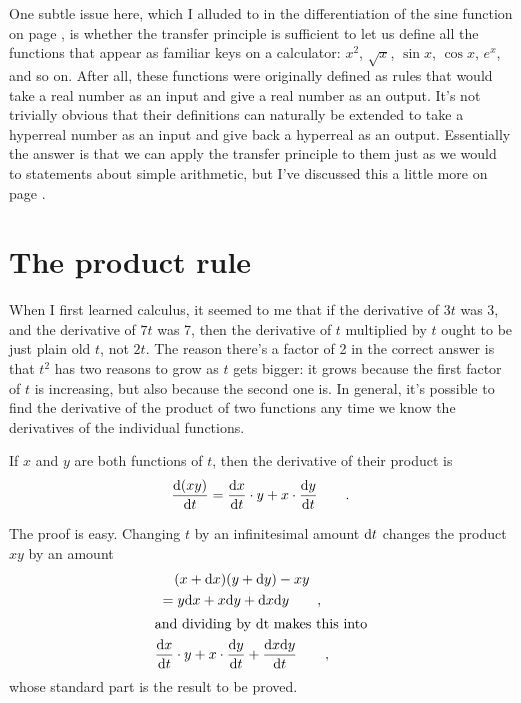 \label{transcendentals}
One subtle issue here, which I alluded to in the differentiation of the sine function on page \pageref{eg:derivative-of-sin},
is whether the transfer principle is sufficient to let us define all the functions that
appear as familiar keys on a calculator: $x^2$, $\sqrt{x}$, $\sin x$, $\cos x$, $e^x$, and so on.
After all, these functions were originally defined as rules that would take a real number as an input
and give a real number as an output. It's not trivially obvious that their definitions can naturally be extended
to take a hyperreal number as an input and give back a hyperreal as an output. Essentially the answer is that
we can apply the transfer principle to them just as we would to statements about simple arithmetic, but I've discussed
this a little more on page \pageref{detour:transcendentals}.

\section{The product rule}

When I first learned calculus, it seemed to me that if the derivative of $3t$ was $3$, and the derivative of
$7t$ was 7, then the derivative of $t$ multiplied by $t$ ought to be just plain old $t$, not $2t$. The reason there's
a factor of 2 in the correct answer is that $t^2$ has two reasons to grow as $t$ gets bigger: it grows because
the first factor of $t$ is increasing, but also because the second one is. In general, it's possible to find
the derivative of the product of two functions any time we know the derivatives of the individual functions.

\begin{important}
If $x$ and $y$ are both functions of $t$, then the derivative of their product is
\begin{equation*}
  \frac{\textup{d}(xy)}{\textup{d} t} = \frac{\textup{d} x}{\textup{d} t}\cdot y +  x \cdot \frac{\textup{d} y}{\textup{d} t} \qquad .
\end{equation*}
\end{important}

The proof is easy. Changing $t$ by an infinitesimal amount $\textup{d} t$ changes the product $xy$ by
an amount
\begin{gather*}
  (x+\textup{d} x)(y+\textup{d} y)-xy \\
      = y\textup{d} x + x\textup{d} y+\textup{d} x\textup{d} y \qquad , \\
\intertext{and dividing by \textup{d}t makes this into}
      \frac{\textup{d} x}{\textup{d} t}\cdot y +  x \cdot \frac{\textup{d} y}{\textup{d} t} + \frac{\textup{d} x \textup{d} y}{\textup{d} t} \qquad ,
\end{gather*}
whose standard part is the result to be proved.

